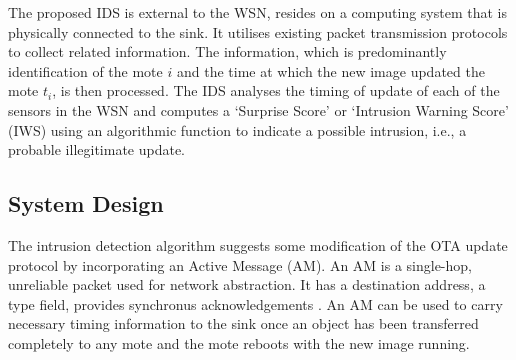 \documentclass[conference,final]{IEEEtran}
\newcommand{\dme}[2]{\pdfmarkupcomment[markup=Highlight,color=yellow]{#1}{#2}}
\begin{document}
The proposed IDS is external to the WSN, resides on a computing system that is physically connected to the sink.
It utilises existing packet transmission protocols to collect related information. The information, which is predominantly identification of the mote $i$ and the time at which the new image updated the mote $t_i$, is then processed.
The IDS analyses the timing of update of each of the sensors in the WSN and computes a `Surprise Score' or `Intrusion Warning Score' (IWS) using an algorithmic function to indicate a possible intrusion, i.e., a probable illegitimate update.




\subsection{System Design}
\label{subsec:sysdeg}

The intrusion detection algorithm suggests some modification of the OTA update protocol by incorporating an Active Message (AM).
An AM is a single-hop, unreliable packet used for network abstraction. 
It has a destination address, a type  field, provides synchronus acknowledgements \cite{tep116}. 
An AM can be used to carry necessary timing information to the sink once an object has been transferred completely to any mote and the mote reboots with the new image running.
\end{document}
